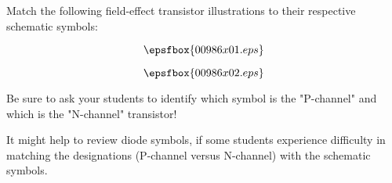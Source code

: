 

Match the following field-effect transistor illustrations to their respective schematic symbols:

$$\epsfbox{00986x01.eps}$$







$$\epsfbox{00986x02.eps}$$
 






Be sure to ask your students to identify which symbol is the "P-channel" and which is the "N-channel" transistor!

It might help to review diode symbols, if some students experience difficulty in matching the designations (P-channel versus N-channel) with the schematic symbols.




